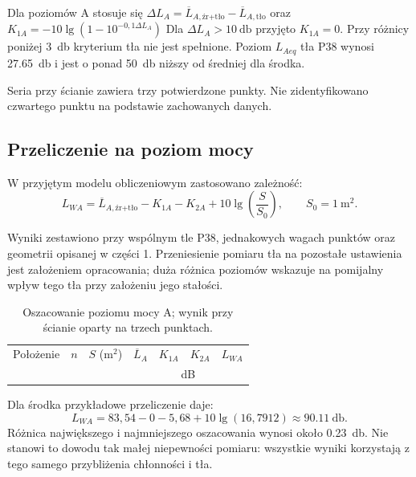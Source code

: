 Dla poziomów A stosuje się
$\Delta L_A=\overline L_{A,\text{źr+tło}}-\overline L_{A,\text{tło}}$
oraz $K_{1A}=-10\lg(1-10^{-0{,}1\Delta L_A})$ Dla $\Delta L_A>\qty{10}{\decibel}$ przyjęto
$K_{1A}=0$. Przy różnicy poniżej \qty{3}{\decibel} kryterium tła nie jest
spełnione. Poziom $L_{Aeq}$ tła P38 wynosi \qty{27.65}{\decibel} i jest o ponad \qty{50}{\decibel} niższy od średniej
dla środka.

Seria przy ścianie zawiera trzy potwierdzone punkty. Nie zidentyfikowano
czwartego punktu na podstawie zachowanych danych.

\subsection{Przeliczenie na poziom mocy}
W przyjętym modelu obliczeniowym zastosowano zależność:
\begin{equation}
L_{WA}=\overline L_{A,\text{źr+tło}}-K_{1A}-K_{2A}
+10\lg\left(\frac{S}{S_0}\right),\qquad S_0=\qty{1}{\metre\squared}.
\end{equation}

Wyniki zestawiono przy wspólnym tle P38, jednakowych wagach punktów
oraz geometrii opisanej w części 1. Przeniesienie pomiaru tła na pozostałe
ustawienia jest założeniem opracowania; duża różnica poziomów wskazuje
na pomijalny wpływ tego tła przy założeniu jego stałości.
\begin{table}[H]
\centering\small
\caption{Oszacowanie poziomu mocy A; wynik przy ścianie oparty na trzech punktach.}
\begin{tabular}{@{}l c r r r r r@{}}
\toprule
Położenie & $n$ & $S$ (m$^2$) & $\overline L_A$ & $K_{1A}$ & $K_{2A}$ & $L_{WA}$\\
 & & & \multicolumn{4}{c}{dB}\\
\midrule

\end{tabular}
\end{table}
Dla środka przykładowe przeliczenie daje:
\begin{equation}
L_{WA}=83{,}54-0-5{,}68+10\lg(16{,}7912)
\approx\qty{90.11}{\decibel}.
\end{equation}
Różnica największego i najmniejszego oszacowania wynosi około
\qty{0.23}{\decibel}. Nie stanowi to dowodu tak małej niepewności pomiaru:
wszystkie wyniki korzystają z tego samego przybliżenia chłonności i tła.
